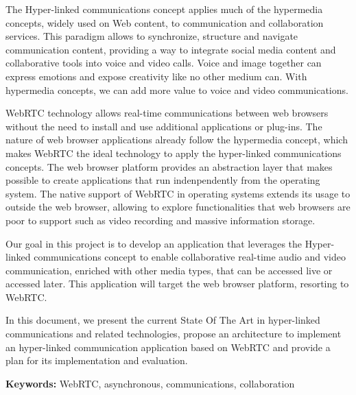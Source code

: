 The Hyper-linked communications concept applies much of the hypermedia concepts, widely used on Web content, to communication and collaboration services. This paradigm allows to synchronize, structure and navigate communication content, providing a way to integrate social media content and collaborative tools into voice and video calls.
Voice and image together can express emotions and expose creativity like no other medium can. With hypermedia concepts, we can add more value to voice and video communications.

\ac{WebRTC} technology allows real-time communications between web browsers without the need to install and use additional applications or plug-ins. The nature of web browser applications already follow the hypermedia concept, which makes \ac{WebRTC} the ideal technology to apply the hyper-linked communications concepts.
{\color{blue}The web browser platform provides an abstraction layer that makes possible to create applications that run indenpendently from the operating system.}
The native support of \ac{WebRTC} in operating systems extends its usage to outside the web browser, allowing to explore functionalities that web browsers are poor to support such as video recording and massive information storage.

Our goal in this project is to develop an application that leverages the Hyper-linked communications concept to enable collaborative real-time audio and video communication, enriched with other media types, that can be accessed live or accessed later.
This application will target the web browser platform, resorting to \ac{WebRTC}.

In this document, we present the current State Of The Art in hyper-linked communications and related technologies, propose an architecture to implement an hyper-linked communication application based on \ac{WebRTC} and provide a plan for its implementation and evaluation.

\vspace{1cm}

\textbf{\Large Keywords:} WebRTC, asynchronous, communications, collaboration

